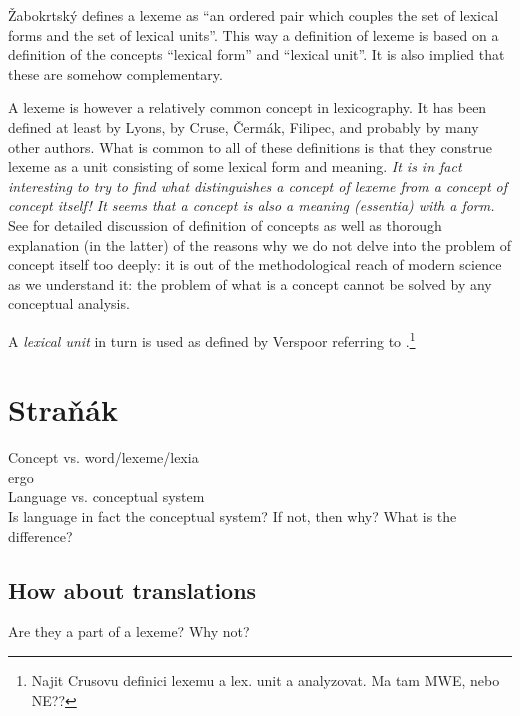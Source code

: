 Žabokrtský defines a lexeme as ``an ordered pair which couples the set of lexical forms and the set of lexical units''. This way a definition of lexeme is based on a definition of the concepts ``lexical form'' and ``lexical unit''. It is also implied that these are somehow complementary. 

A lexeme is however a relatively common concept in lexicography. It has been defined at least by Lyons, by Cruse, Čermák, Filipec, and probably by many other authors. What is common to all of these definitions is that they construe lexeme as a unit consisting of some lexical form and meaning. 
\emph{It is in fact interesting to try to find what distinguishes a concept of lexeme from a concept of concept itself! It seems that a concept is also a meaning (essentia) with a form.} See \citet{materna:1998,stranak:2001} for detailed discussion of definition of concepts as well as thorough explanation (in the latter) of the reasons why we do not delve into the problem of concept itself too deeply: it is out of the methodological reach of modern science as we understand it: the problem of what is a concept cannot be solved by any conceptual analysis.

A \emph{lexical unit} in turn is used as defined by Verspoor referring to \citet{cruse:1986}.\footnote%
{\xxx Najit Crusovu definici lexemu a lex. unit a analyzovat. Ma tam MWE, nebo NE??} 

\section{Straňák}
Concept vs. word/lexeme/lexia\\
ergo\\
Language vs. conceptual system\\
Is language in fact the conceptual system? If not, then why? What is the difference? 

\subsection{How about translations}
Are they a part of a lexeme? Why not?

